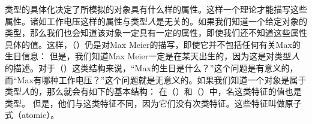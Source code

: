 类型的具体化决定了所模拟的对象具有什么样的属性。这样一个理论才能描写这些属性。诸如\textsc{工作电压}这样的属性与类型\textit{人}是无关的。如果我们知道一个给定对象的类型，那么我们也会知道该对象一定具有一定的属性，即使我们还不知道这些属性具体的值。这样，（）仍是对Max Meier的描写，即使它并不包括任何有关Max的生日信息：
\ea
{}
\z
但是，我们知道Max Meier一定是在某天出生的，因为这是对类型\textit{人}的描述。对于（）这类结构来说，“Max的生日是什么？”这个问题是有意义的，而“Max有哪种工作电压？”这个问题就是无意义的。如果我们知道一个对象是属于类型\textit{人}的，那么就会有如下的基本结构：
\ea
{}
\z
在（）和（）中，\textsc{名}这类特征的值也是类型。
但是，他们与这类特征不同，因为它们没有次类特征。这些特征叫做原子式（atomic）。

